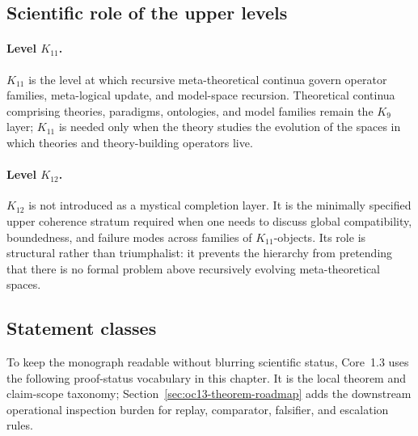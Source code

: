 \subsection{Scientific role of the upper levels}

\paragraph{Level \texorpdfstring{$K_{11}$}{K11}.}
\(K_{11}\) is the level at which recursive meta-theoretical continua govern
operator families, meta-logical update, and model-space recursion. Theoretical
continua comprising theories, paradigms, ontologies, and model families remain
the \(K_9\) layer; \(K_{11}\) is needed only when the theory studies the
evolution of the spaces in which theories and theory-building operators live.

\paragraph{Level \texorpdfstring{$K_{12}$}{K12}.}
\(K_{12}\) is not introduced as a mystical completion layer.
It is the minimally specified upper coherence stratum required when one needs
to discuss global compatibility, boundedness, and failure modes across families
of \(K_{11}\)-objects.
Its role is structural rather than triumphalist: it prevents the hierarchy from
pretending that there is no formal problem above recursively evolving
meta-theoretical spaces.

\subsection{Statement classes}

To keep the monograph readable without blurring scientific status, Core~1.3 uses the
following proof-status vocabulary in this chapter. It is the local theorem and
claim-scope taxonomy; Section~\ref{sec:oc13-theorem-roadmap} adds the
downstream operational inspection burden for replay, comparator, falsifier, and
escalation rules.

